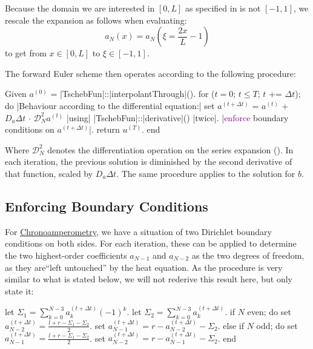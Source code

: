 \documentclass{prettytex/ox/mmsc-special-topic}
\begin{document}
  Because the domain we are interested in $[0, L]$ as specified in  is not $[-1, 1]$, we rescale the expansion as follows when evaluating:
  $$a_N(x) = a_N\left(\xi = \frac{2 x}{L} - 1\right)$$
  to get from $x \in [0, L]$ to $\xi \in [-1, 1]$.

  The forward Euler scheme then operates according to the following procedure:
  \begin{algorithm}[language=pseudo, caption={\centering A Spectral Method in the Chebyshev Basis}, basicstyle=\footnotesize]
Given $a^{(0)}$ = |\color{themecolor3}TschebFun|::|\color{themecolor2}interpolantThrough|().
for ($t = 0$; $t \le T$; $t$ += $\Delta t$); do
  |\rm\color{gray}Behaviour according to the differential equation:|
  set $a^{(t+\Delta t)}$ = $a^{(t)}$ + $D_a \Delta t$ $\cdot$ $\mathcal{D}_N^2 a^{(t)}$ |\rm\color{gray}using| |\color{themecolor3}TschebFun|::|\color{themecolor2}derivative|() |\rm\color{gray}twice|.
  |\rm \textcolor{purple}{enforce} boundary conditions on $a^{(t+\Delta t)}$|.
  return $u^{(T)}$.
end
  \end{algorithm}
  Where $\mathcal{D}_N^2$ denotes the differentiation operation on the series expansion ().
  In each iteration, the previous solution is diminished by the second derivative of that function, scaled by $D_a \Delta t$.
  The same procedure applies to the solution for $b$.

  \subsection{Enforcing Boundary Conditions}
  For \underline{Chronoamperometry}, we have a situation of two Dirichlet boundary conditions on both sides. For each iteration, these can be applied to determine the two highest-order coefficients $a_{N-1}$ and $a_{N-2}$ as the two degrees of freedom, as they are``left untouched'' by the heat equation.
  As the procedure is very similar to what is stated below, we will not rederive this result here, but only state it:
  \begin{algorithm}[language=pseudo, caption={\centering Enforcing Dirichlet Boundary Conditions on both sides}, basicstyle=\footnotesize]
let $\Sigma_1 = \sum_{k=0}^{N-3} a_k^{(t+\Delta t)} (-1)^k$.
let $\Sigma_2 = \sum_{k=0}^{N-3} a_k^{(t+\Delta t)}$.
if $N$ even; do
  set $a_{N-2}^{(t+\Delta t)} = \frac{l+r-\Sigma_1-\Sigma_2}{2}$.
  set $a_{N-1}^{(t+\Delta t)} = r - a_{N-2}^{(t+\Delta t)} - \Sigma_2$.
else if $N$ odd; do
  set $a_{N-1}^{(t+\Delta t)} = \frac{l+r-\Sigma_1-\Sigma_2}{2}$.
  set $a_{N-2}^{(t+\Delta t)} = r - a_{N-1}^{(t+\Delta t)} - \Sigma_2$.
end
  \end{algorithm}
\end{document}
